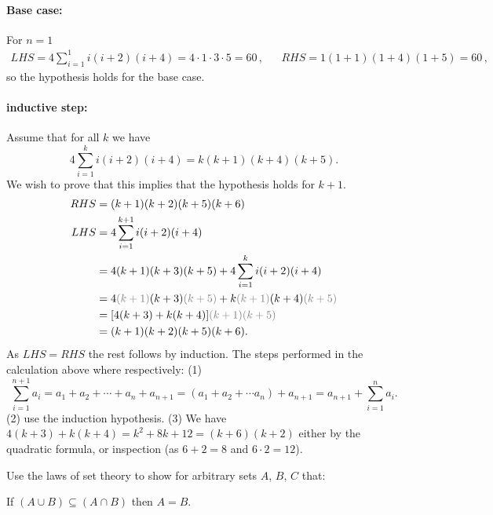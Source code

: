 \documentclass[a4paper, english, 12pt]{article} %
\begin{document}
\begin{answer}
  \paragraph{Base case:} For $n=1$
  \begin{align*}
    LHS = 4 \sum_{i=1}^{1} i(i+2)(i+4) = 4\cdot 1 \cdot 3 \cdot 5 = 60\,,
    && RHS = 1(1+1)(1+4)(1+5) = 60\,,
  \end{align*}
  so the hypothesis holds for the base case.
  \paragraph{inductive step:} Assume that for all $k$ we have
  \begin{equation*}
    4 \sum_{i=1}^k i(i+2)(i+4) = k(k+1)(k+4)(k+5).
  \end{equation*}
  We wish to prove that this implies that the hypothesis holds for $k+1$.
  \begin{align*}
    RHS & = (k+1)(k+2)(k+5)(k+6) \\
    LHS & = 4 \sum_{i = 1}^{k+1} i(i+2)(i+4) \\
        & = 4 (k+1)(k+3)(k+5) + 4 \sum_{i=1}^{k} i(i+2)(i+4) \\
        & = 4 \textcolor{gray}{(k+1)}(k+3)\textcolor{gray}{(k+5)} + k\textcolor{gray}{(k+1)}(k+4)\textcolor{gray}{(k+5)} \\
        & = [4(k+3) + k(k+4)]\textcolor{gray}{(k+1)(k+5)} \\
        & = (k+1)(k+2)(k+5)(k+6).
  \end{align*}
  As $LHS = RHS$ the rest follows by induction. The steps performed in the
  calculation above where respectively: (1)
  \begin{equation*}
    \sum_{i=1}^{n+1} a_i = a_1 + a_2 + \cdots + a_{n} + a_{n+1}
    = ( a_1 + a_2 + \cdots a_{n} ) + a_{n+1}
    = a_{n+1} + \sum_{i = 1}^{n} a_i.
  \end{equation*}
  (2) use the induction hypothesis. (3) We
  have $4(k+3) + k(k+4) = k^2 + 8k + 12 = (k+6)(k+2)$ either by the quadratic
  formula, or inspection (as $6+2 = 8$ and $6\cdot 2 = 12$).
\end{answer}
  

\begin{problem}[7]
  Use the laws of set theory to show for arbitrary sets $A$, $B$, $C$ that:
\end{problem}

\begin{subproblem}
  If $(A \cup B) \subseteq (A \cap B)$ then $A = B$.
\end{subproblem}
\end{document}
